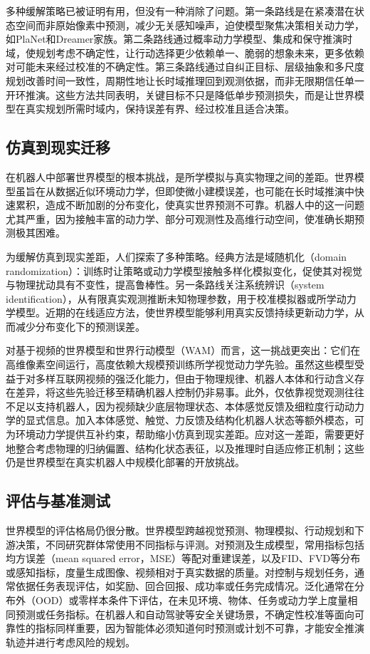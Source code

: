 多种缓解策略已被证明有用，但没有一种消除了问题。第一条路线是在紧凑潜在状态空间而非原始像素中预测，减少无关感知噪声，迫使模型聚焦决策相关动力学，如PlaNet和Dreamer家族\citep{hafner2019planet,hafner2019dreamer,hafner2021dreamerv2,hafner2023dreamerv3}。第二条路线通过概率动力学模型、集成和保守推演时域，使规划考虑不确定性，让行动选择更少依赖单一、脆弱的想象未来，更多依赖对可能未来经过校准的不确定性\citep{chua2018pets,janner2019mbpo,hansen2022tdmpc,hansen2023tdmpc2}。第三条路线通过自纠正目标、层级抽象和多尺度规划改善时间一致性，周期性地让长时域推理回到观测依据，而非无限期信任单一开环推演\citep{talvitie2017selfcorrecting,hafner2022director,gumbsch2024learning}。这些方法共同表明，关键目标不只是降低单步预测损失，而是让世界模型在真实规划所需时域内，保持误差有界、经过校准且适合决策。

\subsection{仿真到现实迁移}
在机器人中部署世界模型的根本挑战，是所学模拟与真实物理之间的差距。世界模型虽旨在从数据近似环境动力学，但即使微小建模误差，也可能在长时域推演中快速累积，造成不断加剧的分布变化，使真实世界预测不可靠。机器人中的这一问题尤其严重，因为接触丰富的动力学、部分可观测性及高维行动空间，使准确长期预测极其困难。

为缓解仿真到现实差距，人们探索了多种策略。经典方法是域随机化（domain randomization）：训练时让策略或动力学模型接触多样化模拟变化，促使其对视觉与物理扰动具有不变性，提高鲁棒性\citep{tobin2017domain,peng2018sim}。另一条路线关注系统辨识（system identification），从有限真实观测推断未知物理参数，用于校准模拟器或所学动力学模型\citep{nagabandi2018learning}。近期的在线适应方法，使世界模型能够利用真实反馈持续更新动力学，从而减少分布变化下的预测误差\citep{hafner2019dreamer,nagabandi2018neural}。

对基于视频的世界模型和世界行动模型（WAM）而言，这一挑战更突出：它们在高维像素空间运行，高度依赖大规模预训练所学视觉动力学先验。虽然这些模型受益于对多样互联网视频的强泛化能力，但由于物理规律、机器人本体和行动含义存在差异，将这些先验迁移至精确机器人控制仍非易事。此外，仅依靠视觉观测往往不足以支持机器人，因为视频缺少底层物理状态、本体感觉反馈及细粒度行动动力学的显式信息。加入本体感觉、触觉、力反馈及结构化机器人状态等额外模态，可为环境动力学提供互补约束，帮助缩小仿真到现实差距。应对这一差距，需要更好地整合考虑物理的归纳偏置、结构化状态表征，以及推理时自适应修正机制；这些仍是世界模型在真实机器人中规模化部署的开放挑战。

\subsection{评估与基准测试}
世界模型的评估格局仍很分散。世界模型跨越视觉预测、物理模拟、行动规划和下游决策，不同研究群体常使用不同指标与评测。对预测及生成模型，常用指标包括均方误差（mean squared error，MSE）等配对重建误差，以及FID、FVD等分布或感知指标，度量生成图像、视频相对于真实数据的质量。对控制与规划任务，通常依据任务表现评估，如奖励、回合回报、成功率或任务完成情况。泛化通常在分布外（OOD）或零样本条件下评估，在未见环境、物体、任务或动力学上度量相同预测或任务指标。在机器人和自动驾驶等安全关键场景，不确定性校准等面向可靠性的指标同样重要，因为智能体必须知道何时预测或计划不可靠，才能安全推演轨迹并进行考虑风险的规划。

